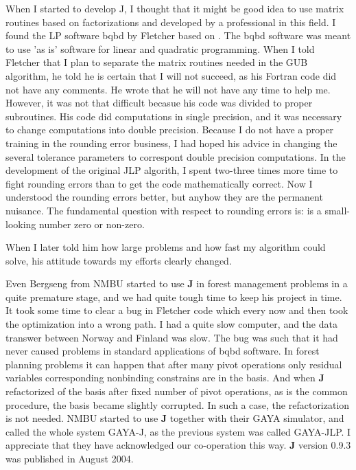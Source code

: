 When I started to develop J, I thought that it might be good idea to use matrix routines
based on factorizations and developed by a professional in this field.
I found the LP software bqbd by Fletcher
based on \cite{flet}. The bqbd software was meant to use 'as is' software for linear and quadratic programming.
When I told Fletcher that I plan to separate the matrix routines needed in the GUB algorithm,
he told he is certain that I will not succeed, as his Fortran code did not have any comments.
He wrote that he will not have any time to help me.
However, it was not that difficult becasue his code was divided
to proper subroutines. His code did computations in
single precision, and it was necessary to change computations
into double precision. Because I do not have
a proper training in the rounding error business,
I had hoped his advice in changing the several tolerance
parameters to correspont double precision computations. In the development of the original JLP algorith,
I spent two-three times more time to fight rounding errors than to
get the code mathematically correct. Now I understood the rounding errors better, but
anyhow they are the permanent nuisance. The fundamental question
with respect to rounding errors is: is a small-looking number zero or non-zero.

When I later told him how large problems and how fast my algorithm could solve,
his attitude towards
my efforts clearly changed.

Even Bergseng from NMBU started to use \textbf{J} in forest management problems
in a quite premature
stage, and we had quite tough time to keep his project in time.
It took some time to clear a bug in Fletcher
code which every now and then took the optimization into a wrong path.
I had a quite slow computer, and the
data transwer between Norway and Finland was slow. The bug was such that
it had never caused problems in
standard applications of bqbd software. In forest planning problems
it can happen that after many
pivot operations only residual variables corresponding nonbinding
constrains are in the basis.
And when \textbf{J} refactorized of the basis after fixed number of pivot operations,
as is the common procedure, the basis became slightly corrupted.
In such a case, the refactorization is not needed. NMBU started to use \textbf{J}
together with their GAYA simulator, and called the whole system GAYA-J,
as the previous system was called GAYA-JLP.
I appreciate that they have acknowledged our co-operation this way.
\textbf{J} version 0.9.3 was published in
August 2004.

